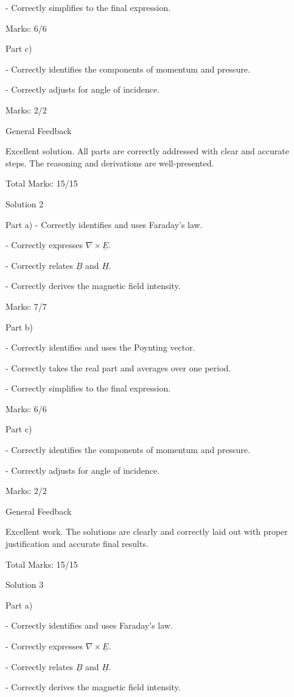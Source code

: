 \documentclass[a4paper,11pt]{article}
\begin{document}
- Correctly simplifies to the final expression.

Marks: 6/6

Part c)

- Correctly identifies the components of momentum and pressure.

- Correctly adjusts for angle of incidence.

Marks: 2/2

General Feedback

Excellent solution. All parts are correctly addressed with clear and accurate steps. The reasoning and derivations are well-presented.

Total Marks: 15/15

Solution 2

Part a)
- Correctly identifies and uses Faraday's law.

- Correctly expresses \(\nabla \times \underline{E}\).

- Correctly relates \(\underline{B}\) and \(\underline{H}\).

- Correctly derives the magnetic field intensity.

Marks: 7/7

Part b)

- Correctly identifies and uses the Poynting vector.

- Correctly takes the real part and averages over one period.

- Correctly simplifies to the final expression.

Marks: 6/6

Part c)

- Correctly identifies the components of momentum and pressure.

- Correctly adjusts for angle of incidence.

Marks: 2/2

General Feedback

Excellent work. The solutions are clearly and correctly laid out with proper justification and accurate final results.

Total Marks: 15/15

Solution 3

Part a)

- Correctly identifies and uses Faraday's law.

- Correctly expresses \(\nabla \times \underline{E}\).

- Correctly relates \(\underline{B}\) and \(\underline{H}\).

- Correctly derives the magnetic field intensity.
\end{document}
